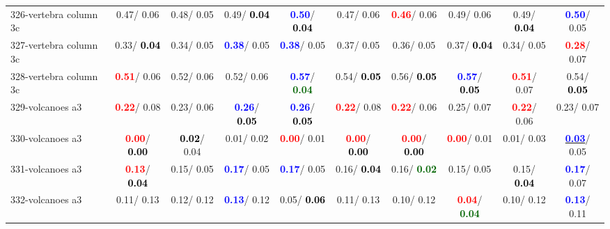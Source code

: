 \begin{table}[h]
\begin{center}
{\begin{tabular}{lc|c|c|c|c|c|c|c|c}
326-vertebra column 3c &   0.47/  0.06 &   0.48/  0.05 &   0.49/\textcolor{black}{\textbf{  0.04}} & \textcolor{blue}{\textbf{  0.50}}/\textcolor{black}{\textbf{  0.04}} &   0.47/  0.06 & \textcolor{red}{\textbf{  0.46}}/  0.06 &   0.49/  0.06 &   0.49/\textcolor{black}{\textbf{  0.04}} & \textcolor{blue}{\textbf{  0.50}}/  0.05 \\
327-vertebra column 3c &   0.33/\textcolor{black}{\textbf{  0.04}} &   0.34/  0.05 & \textcolor{blue}{\textbf{  0.38}}/  0.05 & \textcolor{blue}{\textbf{  0.38}}/  0.05 &   0.37/  0.05 &   0.36/  0.05 &   0.37/\textcolor{black}{\textbf{  0.04}} &   0.34/  0.05 & \textcolor{red}{\textbf{  0.28}}/  0.07 \\ \hline
328-vertebra column 3c & \textcolor{red}{\textbf{  0.51}}/  0.06 &   0.52/  0.06 &   0.52/  0.06 & \textcolor{blue}{\textbf{  0.57}}/\textcolor{darkgreen}{\textbf{  0.04}} &   0.54/\textcolor{black}{\textbf{  0.05}} &   0.56/\textcolor{black}{\textbf{  0.05}} & \textcolor{blue}{\textbf{  0.57}}/\textcolor{black}{\textbf{  0.05}} & \textcolor{red}{\textbf{  0.51}}/  0.07 &   0.54/\textcolor{black}{\textbf{  0.05}} \\
329-volcanoes a3 & \textcolor{red}{\textbf{  0.22}}/  0.08 &   0.23/  0.06 & \textcolor{blue}{\textbf{  0.26}}/\textcolor{black}{\textbf{  0.05}} & \textcolor{blue}{\textbf{  0.26}}/\textcolor{black}{\textbf{  0.05}} & \textcolor{red}{\textbf{  0.22}}/  0.08 & \textcolor{red}{\textbf{  0.22}}/  0.06 &   0.25/  0.07 & \textcolor{red}{\textbf{  0.22}}/  0.06 &   0.23/  0.07 \\
330-volcanoes a3 & \textcolor{red}{\textbf{  0.00}}/\textcolor{black}{\textbf{  0.00}} & \textcolor{black}{\textbf{  0.02}}/  0.04 &   0.01/  0.02 & \textcolor{red}{\textbf{  0.00}}/  0.01 & \textcolor{red}{\textbf{  0.00}}/\textcolor{black}{\textbf{  0.00}} & \textcolor{red}{\textbf{  0.00}}/\textcolor{black}{\textbf{  0.00}} & \textcolor{red}{\textbf{  0.00}}/  0.01 &   0.01/  0.03 & \underline{\textcolor{blue}{\textbf{  0.03}}}/  0.05 \\
331-volcanoes a3 & \textcolor{red}{\textbf{  0.13}}/\textcolor{black}{\textbf{  0.04}} &   0.15/  0.05 & \textcolor{blue}{\textbf{  0.17}}/  0.05 & \textcolor{blue}{\textbf{  0.17}}/  0.05 &   0.16/\textcolor{black}{\textbf{  0.04}} &   0.16/\textcolor{darkgreen}{\textbf{  0.02}} &   0.15/  0.05 &   0.15/\textcolor{black}{\textbf{  0.04}} & \textcolor{blue}{\textbf{  0.17}}/  0.07 \\
332-volcanoes a3 &   0.11/  0.13 &   0.12/  0.12 & \textcolor{blue}{\textbf{  0.13}}/  0.12 &   0.05/\textcolor{black}{\textbf{  0.06}} &   0.11/  0.13 &   0.10/  0.12 & \textcolor{red}{\textbf{  0.04}}/\textcolor{darkgreen}{\textbf{  0.04}} &   0.10/  0.12 & \textcolor{blue}{\textbf{  0.13}}/  0.11 \\

\end{tabular}}
\end{center}
\end{table}
